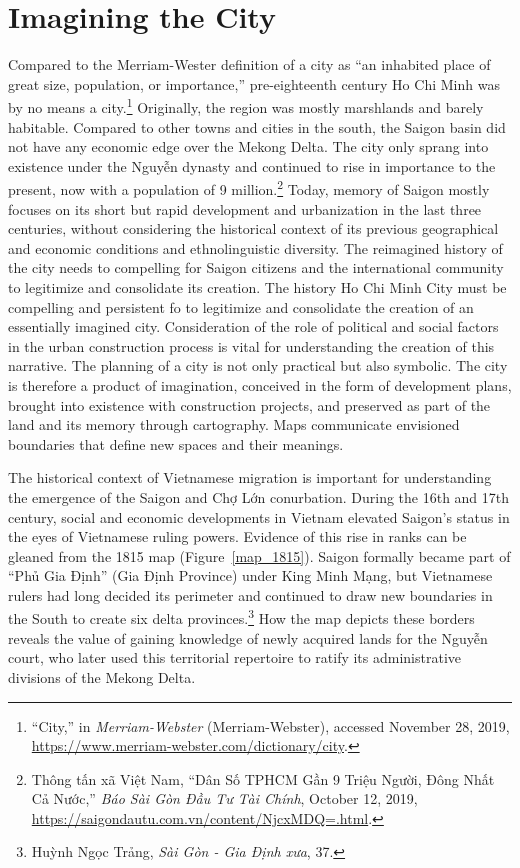 \section{Imagining the City}
Compared to the Merriam-Wester definition of a city as “an inhabited place of great size, population, or importance,” pre-eighteenth century Ho Chi Minh was by no means a city.\footnote{“City,” in \textit{Merriam-Webster} (Merriam-Webster), accessed November 28, 2019, \url{https://www.merriam-webster.com/dictionary/city}.} Originally, the region was mostly marshlands and barely habitable. Compared to other towns and cities in the south, the Saigon basin did not have any economic edge over the Mekong Delta. The city only sprang into existence under the Nguyễn dynasty and continued to rise in importance to the present, now with a population of 9 million.\footnote{Thông tấn xã Việt Nam, “Dân Số TPHCM Gần 9 Triệu Người, Đông Nhất Cả Nước,” \textit{Báo Sài Gòn Đầu Tư Tài Chính}, October 12, 2019, \url{https://saigondautu.com.vn/content/NjcxMDQ=.html}.} Today, memory of Saigon mostly focuses on its short but rapid development and urbanization in the last three centuries, without considering the historical context of its previous geographical and economic conditions and ethnolinguistic diversity. The reimagined history of the city needs to compelling for Saigon citizens and the international community to legitimize and consolidate its creation. The history Ho Chi Minh City must be compelling and persistent fo to legitimize and consolidate the creation of an essentially imagined city. Consideration of the role of political and social factors in the urban construction process is vital for understanding the creation of this narrative. The planning of a city is not only practical but also symbolic. The city is therefore a product of imagination, conceived in the form of development plans, brought into existence with construction projects, and preserved as part of the land and its memory through cartography. Maps communicate envisioned boundaries that define new spaces and their meanings.

The historical context of Vietnamese migration is important for understanding the emergence of the Saigon and Chợ Lớn conurbation. During the 16th and 17th century, social and economic developments in Vietnam elevated Saigon’s status in the eyes of Vietnamese ruling powers. Evidence of this rise in ranks can be gleaned from the 1815 map (Figure~\ref{map_1815}). Saigon formally became part of “Phủ Gia Định” (Gia Định Province) under King Minh Mạng, but Vietnamese rulers had long decided its perimeter and continued to draw new boundaries in the South to create six delta provinces.\footnote{Huỳnh Ngọc Trảng, \textit{Sài Gòn - Gia Định xưa}, 37.} How the map depicts these borders reveals the value of gaining knowledge of newly acquired lands for the Nguyễn court, who later used this territorial repertoire to ratify its administrative divisions of the Mekong Delta.

